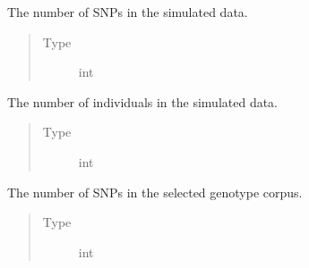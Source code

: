 \documentclass[a4paper,10pt,english]{sphinxhowto}
\begin{document}
\begin{fulllineitems}
\begin{fulllineitems}
\begin{quote}
\begin{description}
\end{description}\end{quote}

\end{fulllineitems}


\begin{fulllineitems}
\label{\detokenize{utils:utils.data_simulator.DataSimulator.num_snps}}
The number of SNPs in the simulated data.
\begin{quote}\begin{description}
\item[{Type}] \leavevmode
int

\end{description}\end{quote}

\end{fulllineitems}


\begin{fulllineitems}
\label{\detokenize{utils:utils.data_simulator.DataSimulator.num_inds}}
The number of individuals in the simulated data.
\begin{quote}\begin{description}
\item[{Type}] \leavevmode
int

\end{description}\end{quote}

\end{fulllineitems}


\begin{fulllineitems}
\label{\detokenize{utils:utils.data_simulator.DataSimulator.total_num_snps}}
The number of SNPs in the selected genotype corpus.
\begin{quote}\begin{description}
\item[{Type}] \leavevmode
int


\end{description}
\end{quote}
\end{fulllineitems}
\end{fulllineitems}
\end{document}
